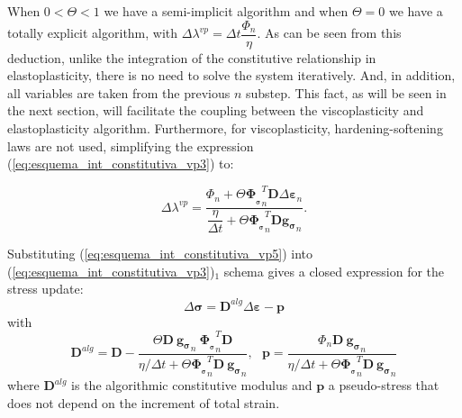 \documentclass[Journal,letterpaper]{ascelike-new}
\newcommand{\Dsdee}{\boldsymbol{D}}
\newcommand{\dPhidsl}{\boldsymbol{\Phi_{_\sigma}}}
\newcommand{\dgds}{\boldsymbol{g_\sigma}}
\newcommand{\strain}{\boldsymbol{\varepsilon}}
\newcommand{\stress}{\boldsymbol{\sigma}}
\begin{document}
When $0 < \Theta < 1$ we have a semi-implicit algorithm and when $\Theta = 0$ we have a totally explicit algorithm, with $\Delta \lambda^{vp} = \Delta t \dfrac{\Phi_n}{\eta}$. As can be seen from this deduction, unlike the integration of the constitutive relationship in elastoplasticity, there is no need to solve the system iteratively. And, in addition, all variables are taken from the previous $n$ substep. This fact, as will be seen in the next section, will facilitate the coupling between the viscoplasticity and elastoplasticity algorithm. Furthermore, for viscoplasticity, hardening-softening laws are not used, simplifying the expression (\ref{eq:esquema_int_constitutiva_vp3}) to:

\begin{equation}
	\label{eq:esquema_int_constitutiva_vp5}
	\Delta \lambda^{vp} = \dfrac{\Phi_n + \Theta \dPhidsl_n^T\Dsdee\Delta\strain_n}{\dfrac{\eta}{\Delta t} + \Theta \dPhidsl_n^T\Dsdee\dgds_n}.
\end{equation}

Substituting (\ref{eq:esquema_int_constitutiva_vp5}) into (\ref{eq:esquema_int_constitutiva_vp3})$_1$ schema gives a closed expression for the stress update:
\begin{equation}
	\label{eq:esquema_int_constitutiva_vp6}
	\Delta \stress = \Dsdee^{alg} \Delta \strain - \boldsymbol p
\end{equation}
with
\begin{equation}
	\label{eq:esquema_int_constitutiva_vp6}
	\Dsdee^{alg} = \Dsdee - \dfrac{\Theta \Dsdee~\dgds_n~\dPhidsl_n^T \Dsdee}{\eta/\Delta t+ \Theta \dPhidsl_n^T\Dsdee~\dgds_n},~~~\boldsymbol p = \dfrac{\Phi_n \Dsdee ~\dgds_n}{\eta/\Delta t+ \Theta \dPhidsl_n^T\Dsdee~\dgds_n}
\end{equation}
where $\Dsdee^{alg}$ is the algorithmic constitutive modulus and $\boldsymbol p$ a pseudo-stress that does not depend on the increment of total strain.
\end{document}
